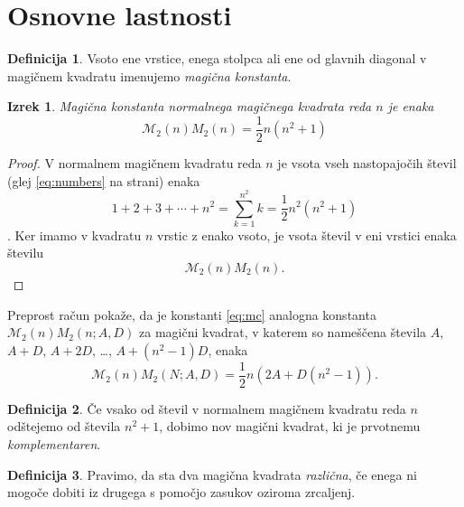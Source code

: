 \documentclass[a4paper,12pt]{article}
\theoremstyle{definition}
\newtheorem{definicija}{Definicija}
\theoremstyle{plain}
\newtheorem{izrek}{Izrek}
\newcommand{\m}{\mathcal{M}_2(n)}
\begin{document}

\section{Osnovne lastnosti}

\begin{definicija}
      Vsoto ene vrstice, enega stolpca ali ene od glavnih diagonal
      v magičnem kvadratu imenujemo \emph{magična konstanta}.
\end{definicija}


\begin{izrek}
      Magična konstanta normalnega magičnega kvadrata reda $n$
      je enaka
      \begin{equation}
         \label{eq:mc}
         \m{M}_2(n)=\frac{1}{2}n(n^2 + 1)
      \end{equation}
\end{izrek}


\begin{proof}
      V normalnem magičnem kvadratu reda \(n\) je vsota vseh nastopajočih
      števil (glej \eqref{eq:numbers} na strani\pageref{eq:numbers}) enaka
      $$1+2+3+\cdots + n^2= \sum_{k=1}^{n^2} k = \frac{1}{2}n^2(n^2 +1)$$. Ker imamo
      v kvadratu \(n\) vrstic z enako vsoto, je vsota števil v eni vrstici
      enaka številu $$ \m{M}_2(n).$$
\end{proof} %

Preprost račun pokaže, da je konstanti \eqref{eq:mc} analogna konstanta
\(\m{M}_2(n;A,D)\) za magični kvadrat, v katerem so nameščena števila
\(A\), \(A+D\), \(A+2D\), \ldots, \(A+(n^2-1)D\), enaka %
   \[
   \m{M}_2(N;A,D) = \frac{1}{2} n (2A + D(n^2 - 1)).
   \]

\begin{definicija}
      Če vsako od števil v normalnem magičnem kvadratu reda \(n\) odštejemo
      od števila $n^2 + 1$, dobimo nov magični kvadrat, ki je prvotnemu
      \emph{komplementaren}.
\end{definicija}

\begin{definicija}
      Pravimo, da sta dva magična kvadrata \emph{različna}, če enega ni mogoče dobiti
      iz drugega s pomočjo zasukov oziroma zrcaljenj.
\end{definicija}
\end{document}
